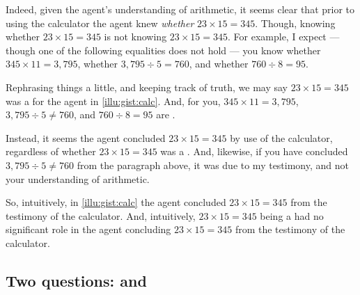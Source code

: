 \begin{note}
  Indeed, given the agent's understanding of arithmetic, it seems clear that prior to using the calculator the agent knew \emph{whether} \(23 \times 15 = 345\).
  Though, knowing whether \(23 \times 15 = 345\) is not knowing \(23 \times 15 = 345\).
  For example, I expect --- though one of the following equalities does not hold --- you know whether \(345 \times 11 = 3,795\), whether \(3,795 \div 5 = 760\), and whether \(760 \div 8 = 95\).

  Rephrasing things a little, and keeping track of truth, we may say \(23 \times 15 = 345\) was a \fc{} for the agent in \autoref{illu:gist:calc}.
  And, for you, \(345 \times 11 = 3,795\), \(3,795 \div 5 \ne 760\), and \(760 \div 8 = 95\) are .

  Instead, it seems the agent concluded \(23 \times 15 = 345\) by use of the calculator, regardless of whether \(23 \times 15 = 345\) was a .
  And, likewise, if you have concluded \(3,795 \div 5 \ne 760\) from the paragraph above, it was due to my testimony, and not your understanding of arithmetic.
\end{note}

\begin{note}
  So, intuitively, in \autoref{illu:gist:calc} the agent concluded \(23 \times 15 = 345\) from the testimony of the calculator.
  And, intuitively, \(23 \times 15 = 345\) being a  had no significant role in the agent concluding \(23 \times 15 = 345\) from the testimony of the calculator.
\end{note}

\subsection{Two questions: \qWhy{} and \qHow{}}

